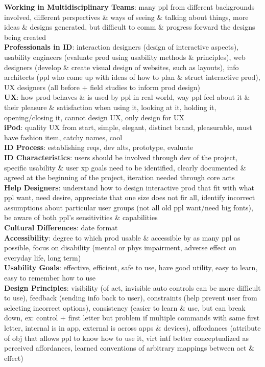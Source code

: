 \documentclass[a4paper]{article}
\begin{document}
\begin{multicols}{3}
        \textbf{Working in Multidisciplinary Teams}: many ppl from different backgrounds involved, different perspectives \& ways of seeing \& talking about things, more ideas \& designs generated, but difficult to comm \& progress forward the designs being created\\
        \textbf{Professionals in ID}: interaction designers (design of interactive aspects), usability engineers (evaluate prod using usability methods \& principles), web designers (develop \& create visual design of websites, such as layouts), info architects (ppl who come up with ideas of how to plan \& struct interactive prod), UX designers (all before + field studies to inform prod design)\\
        \textbf{UX}: how prod behaves \& is used by ppl in real world, way ppl feel about it \& their pleasure \& satisfaction when using it, looking at it, holding it, opening/closing it, cannot design UX, only design for UX\\
        \textbf{iPod}: quality UX from start, simple, elegant, distinct brand, pleasurable, must have fashion item, catchy names, cool\\
        \textbf{ID Process}: establishing reqs, dev alts, prototype, evaluate\\
        \textbf{ID Characteristics}: users should be involved through dev of the project, specific usability \& user xp goals need to be identified, clearly documented \& agreed at the beginning of the project, iteration needed through core acts\\
        \textbf{Help Designers}: understand how to design interactive prod that fit with what ppl want, need desire, appreciate that one size does not fir all, identify incorrect assumptions about particular user groups (not all old ppl want/need big fonts), be aware of both ppl's sensitivities \& capabilities\\
        \textbf{Cultural Differences}: date format\\
        \textbf{Accessibility}: degree to which prod usable \& accessible by as many ppl as possible, focus on disability (mental or phys impairment, adverse effect on everyday life, long term)\\
        \textbf{Usability Goals}: effective, efficient, safe to use, have good utility, easy to learn, easy to remember how to use\\
        \textbf{Design Principles}: visibility (of act, invisible auto controls can be more difficult to use), feedback (sending info back to user), constraints (help prevent user from selecting incorrect options), consistency (easier to learn \& use, but can break down, ex: control + first letter but problem if multiple commands with same first letter, internal is in app, external is across apps \& devices), affordances (attribute of obj that allows ppl to know how to use it, virt intf better conceptualized as perceived affordances, learned conventions of arbitrary mappings between act \& effect)\\

\end{multicols}
\end{document}
